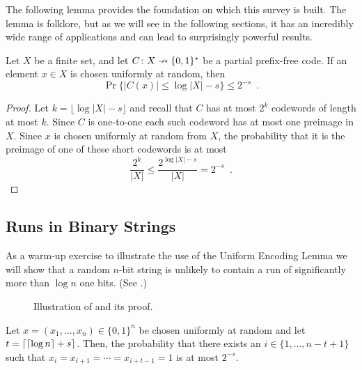 \documentclass[prodmode,acmcsur]{acmsmall}
\begin{document}
The following lemma provides the foundation on which this
survey is built. The lemma is folklore, but as we will see in
the following sections, it has an incredibly wide range of
applications and can lead to surprisingly powerful results.
\begin{lem}
  Let $X$ be a finite set, and 
  let $C\colon X\nrightarrow \{0,1\}^*$ be a partial prefix-free
  code. If an element $x\in X$ is chosen uniformly at random, then
  \[
    \Pr\{|C(x)|\le \log|X|-s\}\le 2^{-s} \enspace .
  \]
\end{lem}

\begin{proof}
  Let $k=\lfloor \log|X|-s \rfloor$ and recall that $C$ has at most $2^{k}$ codewords
  of length at most $k$.  Since $C$ is one-to-one each such codeword
  has at most one preimage in $X$.  Since $x$ is chosen uniformly at
  random from $X$, the probability that it is the preimage of one of
  these short codewords is at most
  \[
  \frac{2^k}{|X|} \leq \frac{2^{\log|X|-s}}{|X|} = 2^{-s} \enspace
  . %
  \]
\end{proof}

\subsection{Runs in Binary Strings}

As a warm-up exercise to illustrate the use of the Uniform Encoding
Lemma we will show that a random $n$-bit string is unlikely to contain
a run of significantly more than $\log n$ one bits.  (See
.)

\begin{figure}
  \caption{Illustration of  and its proof.}
\end{figure}

\begin{thm}
  Let $x=(x_1,\ldots,x_n)\in\{0,1\}^n$ be chosen uniformly at random
  and let $t = {\left\lceil {\lceil \log n \rceil} + s \right\rceil}$. Then, the probability that
  there exists an $i\in\{1,\ldots,n-t+1\}$ such that
  $x_i=x_{i+1}=\cdots=x_{i+t-1}=1$ is at most $2^{-s}$.
\end{thm}
\end{document}
